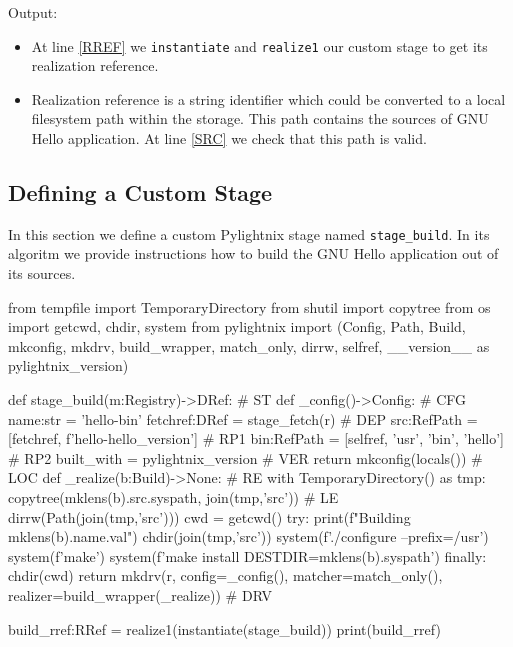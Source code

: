 Output:

\mysmallstdout

\begin{itemize}

  \item At line \ref{RREF} we \texttt{instantiate} and \texttt{realize1} our
    custom stage to get its realization reference.

  \item Realization reference is a string identifier which could be converted to
    a local filesystem path within the storage. This path contains the sources
    of GNU Hello application. At line \ref{SRC} we check that this path is
    valid.

\end{itemize}

\pagebreak
\subsection{Defining a Custom Stage}

In this section we define a custom Pylightnix stage named \texttt{stage\_build}.
In its algoritm we provide instructions how to build the GNU Hello application
out of its sources.

\begin{pythontexcode}
from tempfile import TemporaryDirectory
from shutil import copytree
from os import getcwd, chdir, system
from pylightnix import (Config, Path, Build, mkconfig, mkdrv,
  build_wrapper, match_only, dirrw, selfref,
  __version__ as pylightnix_version)

def stage_build(m:Registry)->DRef:                           # ST \label{ST}
  def _config()->Config:                                    # CFG \label{CFG}
    name:str = 'hello-bin'
    fetchref:DRef = stage_fetch(r)                          # DEP \label{DEP}
    src:RefPath = [fetchref, f'hello-{hello_version}']      # RP1 \label{RP1}
    bin:RefPath = [selfref, 'usr', 'bin', 'hello']          # RP2 \label{RP2}
    built_with = pylightnix_version                         # VER \label{VER}
    return mkconfig(locals())                               # LOC \label{LOC}
  def _realize(b:Build)->None:                              # RE \label{RE}
    with TemporaryDirectory() as tmp:
      copytree(mklens(b).src.syspath, join(tmp,'src'))      # LE \label{LE}
      dirrw(Path(join(tmp,'src')))
      cwd = getcwd()
      try:
        print(f"Building {mklens(b).name.val}")
        chdir(join(tmp,'src'))
        system(f'./configure --prefix=/usr')
        system(f'make')
        system(f'make install DESTDIR={mklens(b).syspath}')
      finally:
        chdir(cwd)
  return mkdrv(r, config=_config(),
                  matcher=match_only(),
                  realizer=build_wrapper(_realize))          # DRV \label{DRV}

build_rref:RRef = realize1(instantiate(stage_build))
print(build_rref)
\end{pythontexcode}

